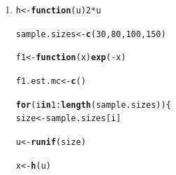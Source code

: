 \documentclass[11pt, a4paper]{article}\usepackage[]{graphicx}\usepackage[]{xcolor}
\makeatletter
\newcommand{\hlnum}[1]{\textcolor[rgb]{0.686,0.059,0.569}{#1}}%
\newcommand{\hlopt}[1]{\textcolor[rgb]{0,0,0}{#1}}%
\newcommand{\hldef}[1]{\textcolor[rgb]{0.345,0.345,0.345}{#1}}%
\newcommand{\hlkwa}[1]{\textcolor[rgb]{0.161,0.373,0.58}{\textbf{#1}}}%
\newcommand{\hlkwb}[1]{\textcolor[rgb]{0.69,0.353,0.396}{#1}}%
\newcommand{\hlkwc}[1]{\textcolor[rgb]{0.333,0.667,0.333}{#1}}%
\newcommand{\hlkwd}[1]{\textcolor[rgb]{0.737,0.353,0.396}{\textbf{#1}}}%
\newenvironment{kframe}{%
 \def\at@end@of@kframe{}%
 \ifinner\ifhmode%
  \def\at@end@of@kframe{\end{minipage}}%
  \begin{minipage}{\columnwidth}%
 \fi\fi%
 \def\FrameCommand##1{\hskip\@totalleftmargin \hskip-\fboxsep
 \colorbox{shadecolor}{##1}\hskip-\fboxsep
     \hskip-\linewidth \hskip-\@totalleftmargin \hskip\columnwidth}%
 \MakeFramed {\advance\hsize-\width
   \@totalleftmargin\z@ \linewidth\hsize
   \@setminipage}}%
 {\par\unskip\endMakeFramed%
 \at@end@of@kframe}
\newenvironment{knitrout}{}{} %
\makeatother
\begin{document}
\begin{enumerate}

\item[\scalebox{2.0}{\twemoji{keycap: 2}}]





\begin{knitrout}
\color{fgcolor}\begin{kframe}
\begin{alltt}
\hldef{h} \hlkwb{<-} \hlkwa{function}\hldef{(}\hlkwc{u}\hldef{)} \hlnum{2} \hlopt{*} \hldef{u}
\end{alltt}
\end{kframe}
\end{knitrout}

\begin{knitrout}
\color{fgcolor}\begin{kframe}
\begin{alltt}
\hldef{sample.sizes} \hlkwb{<-} \hlkwd{c}\hldef{(}\hlnum{30}\hldef{,} \hlnum{80}\hldef{,} \hlnum{100}\hldef{,} \hlnum{150}\hldef{)}
\end{alltt}
\end{kframe}
\end{knitrout}

\begin{knitrout}
\color{fgcolor}\begin{kframe}
\begin{alltt}
\hldef{f1} \hlkwb{<-} \hlkwa{function}\hldef{(}\hlkwc{x}\hldef{)} \hlkwd{exp}\hldef{(}\hlopt{-}\hldef{x)}
\end{alltt}
\end{kframe}
\end{knitrout}

\begin{knitrout}
\color{fgcolor}\begin{kframe}
\begin{alltt}
\hldef{f1.est.mc} \hlkwb{<-} \hlkwd{c}\hldef{()}

\hlkwa{for} \hldef{(i} \hlkwa{in} \hlnum{1}\hlopt{:}\hlkwd{length}\hldef{(sample.sizes)) \{}
  \hldef{size} \hlkwb{<-} \hldef{sample.sizes[i]}

  \hldef{u} \hlkwb{<-} \hlkwd{runif}\hldef{(size)}

  \hldef{x} \hlkwb{<-} \hlkwd{h}\hldef{(u)}


\end{alltt}
\end{kframe}
\end{knitrout}
\end{enumerate}
\end{document}
